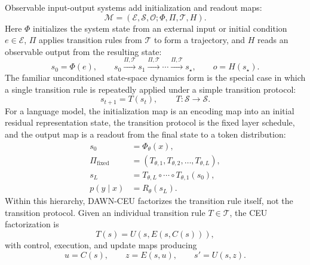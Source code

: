 \documentclass{article}
\begin{document}
Observable input-output systems add initialization and readout maps:
\begin{equation}
    \mathcal{M}=(\mathcal{E},\mathcal{S},\mathcal{O};\Phi,\Pi,\mathcal{T},H).
    \label{eq:app_observable_state_transition_system}
\end{equation}
Here $\Phi$ initializes the system state from an external input or initial condition $e\in\mathcal{E}$, $\Pi$ applies transition rules from $\mathcal{T}$ to form a trajectory, and $H$ reads an observable output from the resulting state:
\begin{equation}
    s_0=\Phi(e),\qquad
    s_0 \xrightarrow{\Pi,\mathcal{T}} s_1 \xrightarrow{\Pi,\mathcal{T}} \cdots \xrightarrow{\Pi,\mathcal{T}} s_\star,\qquad
    o=H(s_\star).
    \label{eq:app_protocol_trajectory}
\end{equation}
The familiar unconditioned state-space dynamics form is the special case in which a single transition rule is repeatedly applied under a simple transition protocol:
\begin{equation}
    s_{t+1}=T(s_t), \,\qquad T:\mathcal{S}\to\mathcal{S}.
    \label{eq:app_state_space_dynamics}
\end{equation}
For a language model, the initialization map is an encoding map into an initial residual representation state, the transition protocol is the fixed layer schedule, and the output map is a readout from the final state to a token distribution:
\begin{align}
    s_0 &= \Phi_\theta(x), \label{eq:app_lm_init}\\
    \Pi_{\mathrm{fixed}} &= (T_{\theta,1},T_{\theta,2},\ldots,T_{\theta,L}), \label{eq:app_lm_protocol}\\
    s_L &= T_{\theta,L}\circ\cdots\circ T_{\theta,1}(s_0), \label{eq:app_lm_dynamics}\\
    p(y\mid x) &= R_\theta(s_L). \label{eq:app_lm_readout}
\end{align}
Within this hierarchy, DAWN-CEU factorizes the transition rule itself, not the transition protocol. Given an individual transition rule $T\in\mathcal{T}$, the CEU factorization is
\begin{equation}
    T(s)=U(s,E(s,C(s))),
    \label{eq:app_ceu_factorized_transition}
\end{equation}
with control, execution, and update maps producing
\begin{equation}
    u=C(s),\qquad z=E(s,u),\qquad s'=U(s,z).
    \label{eq:app_ceu_step}
\end{equation}
\end{document}
